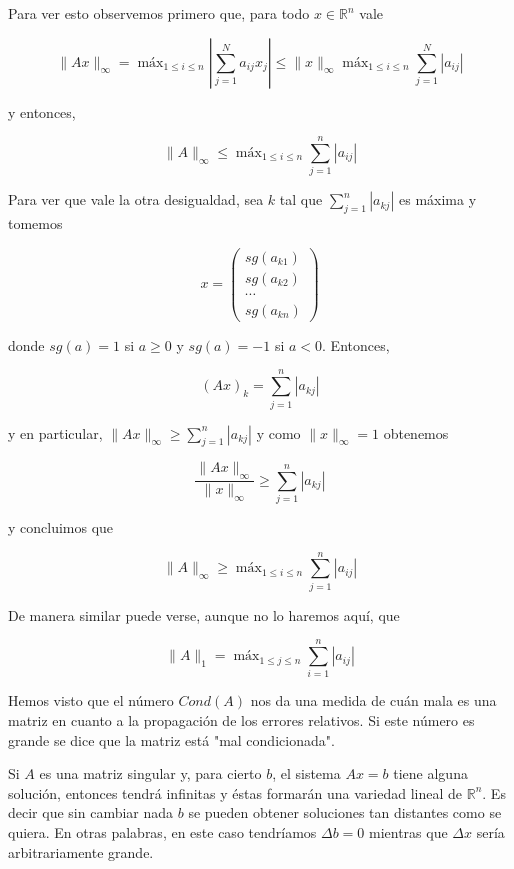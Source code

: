 \documentclass[10pt]{book}
\begin{document}
Para ver esto observemos primero que, para todo $x \in \mathbb{R}^{n}$ vale

$$
\|A x\|_{\infty}=\operatorname{máx}_{1 \leq i \leq n}\left|\sum_{j=1}^{N} a_{i j} x_{j}\right| \leq\|x\|_{\infty} \operatorname{máx}_{1 \leq i \leq n} \sum_{j=1}^{N}\left|a_{i j}\right|
$$

y entonces,

$$
\|A\|_{\infty} \leq \operatorname{máx}_{1 \leq i \leq n} \sum_{j=1}^{n}\left|a_{i j}\right|
$$

Para ver que vale la otra desigualdad, sea $k$ tal que $\sum_{j=1}^{n}\left|a_{k j}\right|$ es máxima y tomemos

$$
x=\left(\begin{array}{c}
s g\left(a_{k 1}\right) \\
s g\left(a_{k 2}\right) \\
\cdots \\
s g\left(a_{k n}\right)
\end{array}\right)
$$

donde $s g(a)=1$ si $a \geq 0$ y $s g(a)=-1$ si $a<0$. Entonces,

$$
(A x)_{k}=\sum_{j=1}^{n}\left|a_{k j}\right|
$$

y en particular, $\|A x\|_{\infty} \geq \sum_{j=1}^{n}\left|a_{k j}\right|$ y como $\|x\|_{\infty}=1$ obtenemos

$$
\frac{\|A x\|_{\infty}}{\|x\|_{\infty}} \geq \sum_{j=1}^{n}\left|a_{k j}\right|
$$

y concluimos que

$$
\|A\|_{\infty} \geq \operatorname{máx}_{1 \leq i \leq n} \sum_{j=1}^{n}\left|a_{i j}\right|
$$

De manera similar puede verse, aunque no lo haremos aquí, que

$$
\|A\|_{1}=\operatorname{máx}_{1 \leq j \leq n} \sum_{i=1}^{n}\left|a_{i j}\right|
$$

Hemos visto que el número $C o n d(A)$ nos da una medida de cuán mala es una matriz en cuanto a la propagación de los errores relativos. Si este número es grande se dice que la matriz está "mal condicionada".

Si $A$ es una matriz singular y, para cierto $b$, el sistema $A x=b$ tiene alguna solución, entonces tendrá infinitas y éstas formarán una variedad lineal de $\mathbb{R}^{n}$. Es decir que sin cambiar nada $b$ se pueden obtener soluciones tan distantes como se quiera. En otras palabras, en este caso tendríamos $\Delta b=0$ mientras que $\Delta x$ sería arbitrariamente grande.
\end{document}
